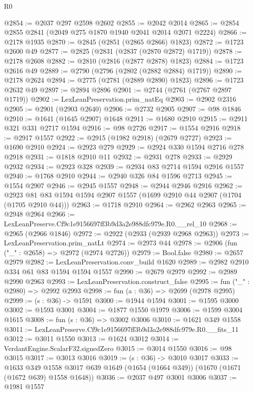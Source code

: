 \begin{lexlean}{R0}
\begin{coremodule}
@2854 := @2037 @297 @2598 @2602
@2855 := @2042 @2014
@2865 := @2854 @2855 @2841 (@2049 @275 @1870 @1940 @2041 @2014 @2071 @2224)
@2866 := @2178 @1935
@2870 := @2845 (@2851 (@2865 @2866) @1823)
@2872 := @1723 @2600 @49
@2877 := @2825 (@2831 (@2837 (@2870 @2872) @1719))
@2878 := @2178 @2608
@2882 := @2810 (@2816 (@2877 @2878) @1823)
@2884 := @1723 @2616 @49
@2889 := @2790 (@2796 (@2802 (@2882 @2884) @1719))
@2890 := @2178 @2624
@2894 := @2775 (@2781 (@2889 @2890) @1823)
@2896 := @1723 @2632 @49
@2897 := @2894 @2896
@2901 := @2744 (@2761 (@2767 @2897 @1719))
@2902 := LexLeanPreservation.prim_natEq
@2903 := @2902 @2316
@2905 := @2901 (@2903 @2640)
@2906 := @2732 @2905
@2907 := @98 @1846
@2910 := @1641 (@1645 @2907) @1648
@2911 := @1680 @2910
@2915 := @2911 @321 @331 @2717 @1594
@2916 := @98 @2726
@2917 := @1554 @2916
@2918 := @2917 @1557
@2922 := @2915 (@1982 @2918) (@2679 @2727)
@2923 := @1690 @2910
@2924 := @2923 @279
@2929 := @2924 @330 @1594 @2716 @278 @2918
@2931 := @1818 @2910 @11
@2932 := @2931 @278
@2933 := @2929 @2932
@2934 := @2923 @328
@2939 := @2934 @83 @2714 @1594 @2916 @1557
@2940 := @1768 @2910
@2944 := @2940 @326 @84 @1596 @2713
@2945 := @1554 @2907
@2946 := @2945 @1557
@2948 := @2944 @2946 @2916
@2962 := @2923 @81 @83 @1594 @1594 @2907 @1557 (@1699 @2910 @44 @2907 (@1704 (@1705 @2910 @44)))
@2963 := @1718 @2910
@2964 := @2962 @2963
@2965 := @2948 @2964
@2966 := LexLeanPreserve.Cf9c1e9156697ff3b9d3a2e988dfc979e.R0.__rel_10
@2968 := @2965 (@2966 @1846)
@2972 := @2922 (@2933 (@2939 @2968 @2963))
@2973 := LexLeanPreservation.prim_natLt
@2974 := @2973 @44
@2978 := @2906 (fun ("_" : @2658) => @2972 (@2974 @2726))
@2979 := Bool.false
@2980 := @2657 @2979
@2982 := LexLeanPreservation.conv_build @1620
@2989 := @2982 @2910 @334 @61 @83 @1594 @1594 @1557
@2990 := @2679 @2979
@2992 := @2989 @2990 @2963
@2993 := LexLeanPreservation.construct_false
@2995 := fun ("_" : @2980) => @2992 @2993
@2998 := fun (a : @36) => @2699 (@2978 @2995)
@2999 := (s : @36) -> @1591
@3000 := @1944 @1594
@3001 := @1595 @3000
@3002 := @1593 @3001
@3004 := @1877 @1550 @1979
@3006 := @1599 @3004 @1615
@3008 := fun (s : @36) => @3002 @3006
@3010 := @1621 @349 @1558
@3011 := LexLeanPreserve.Cf9c1e9156697ff3b9d3a2e988dfc979e.R0.__fits_11
@3012 := @3011 @1550
@3013 := @1624 @3012
@3014 := VerdantEngine.ScalarF32.signedZero
@3015 := @3014 @1550
@3016 := @98 @3015
@3017 := @3013 @3016
@3019 := (s : @36) -> @3010 @3017
@3033 := @1633
    @349
    @1558
    @3017
    @639
    @1649
    (@1654 (@1664 @349))
    (@1670 (@1671 (@1672 @639) @1558 @1648))
@3036 := @2037 @497 @3001 @3006
@3037 := @1981 @1557

\end{coremodule}
\end{lexlean}
